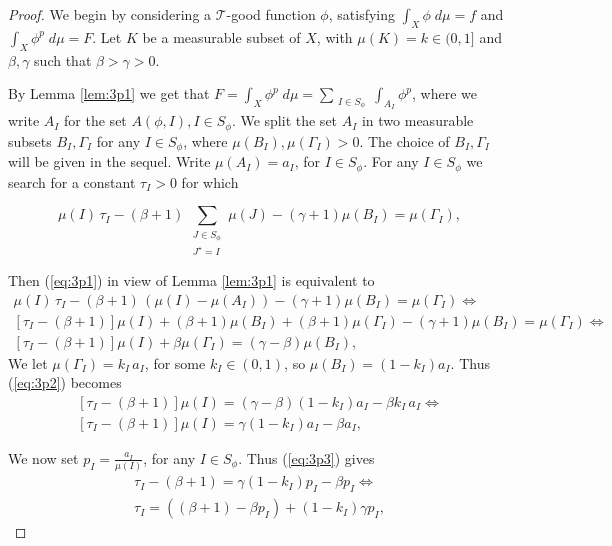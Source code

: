 \documentclass[10pt,a4paper]{amsart}
\newcommand{\mc}[1]{\mathcal{#1}}
\begin{document}
\begin{proof}
We begin by considering a $\mc T$-good function $\phi$, satisfying $\int_X \phi \; d\mu =f$ and $\int_X \phi^p \; d\mu =F$. Let $K$ be a measurable subset of $X$, with $\mu(K)=k\in (0,1]$ and $\beta,\gamma$ such that $\beta>\gamma>0$.

By Lemma \ref{lem:3p1} we get that $F= \int_X \phi^p \; d\mu = \sum_{\substack{I\in S_\phi}} \int_{A_I}\phi^p$, where we write $A_I$ for the set $A(\phi,I), I\in S_{\phi}$. We split the set $A_I$ in two measurable subsets $B_I,\Gamma_I$ for any $I\in S_{\phi}$, where $\mu \left( B_I \right), \mu \left( \Gamma_I \right)>0$. The choice of $B_I,\Gamma_I$ will be given in the sequel. Write $\mu (A_I)=a_I$, for $I\in S_{\phi}$. For any $I\in S_{\phi}$ we search for a constant $\tau_I>0$ for which

\begin{equation}\label{eq:3p1}
\mu (I) \, \tau_I-(\beta +1)\, \sum_{\substack{J\in S_\phi \\ J^\star=I\ }} \mu(J)- (\gamma +1)\mu(B_I)= \mu (\Gamma_I),
\end{equation}

Then (\ref{eq:3p1}) in view of Lemma \ref{lem:3p1} is equivalent to
\begin{multline} \label{eq:3p2}
\mu (I) \, \tau_I-(\beta +1)\,\left( \mu(I)-\mu(A_I) \right)- (\gamma +1)\mu(B_I)= \mu (\Gamma_I)\Leftrightarrow \\
\left[ \tau_I - (\beta +1) \right]\mu (I)+ (\beta +1)\mu(B_I)+(\beta +1)\mu(\Gamma_I)-(\gamma +1)\mu(B_I)=\mu(\Gamma_I)\Leftrightarrow \\
\left[ \tau_I - (\beta +1) \right]\mu (I)+ \beta\mu(\Gamma_I)=(\gamma-\beta)\mu(B_I),
\end{multline}
We let $\mu(\Gamma_I)=k_I\,a_I$, for some $k_I\in (0,1)$, so $\mu(B_I)=(1-k_I)a_I$. Thus (\ref{eq:3p2}) becomes
\begin{multline} \label{eq:3p3}
\left[ \tau_I - (\beta +1) \right]\mu (I)=(\gamma-\beta)(1-k_I)a_I-\beta k_I\,a_I\Leftrightarrow \\
\left[ \tau_I - (\beta +1) \right]\mu (I)= \gamma(1-k_I)a_I-\beta a_I,
\end{multline}

We now set $p_I=\frac{a_I}{\mu(I)}$, for any $I\in S_{\phi}$.
Thus (\ref{eq:3p3}) gives
\begin{multline} \label{eq:3p4}
\tau_I - (\beta +1)=\gamma(1-k_I)p_I-\beta p_I\Leftrightarrow \\
\tau_I=\left( (\beta +1)-\beta p_I \right) + (1-k_I)\gamma p_I,
\end{multline}


\end{proof}
\end{document}
